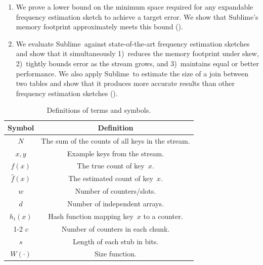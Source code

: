 \documentclass[sigconf]{acmart}
\newcommand{\sketch}{Sublime}
\begin{document}
\begin{enumerate}
    \item We prove a lower bound on the minimum space required for any expandable frequency estimation sketch to achieve a target error.
        We show that \sketch's memory footprint approximately meets this bound ().

    \item We evaluate \sketch\ against state-of-the-art frequency estimation sketches and show that it simultaneously 1)~reduces the memory footprint under skew, 2)~tightly bounds error as the stream grows, and 3)~maintains equal or better performance.
        We also apply \sketch\ to estimate the size of a join between two tables and show that it produces more accurate results than other frequency estimation sketches ().
\end{enumerate}

\begin{table}
    \centering
    \bgroup
    \def\arraystretch{1.025}
    \small
    \begin{tabular}{cc}
        \toprule
        \textbf{Symbol} & \textbf{Definition} \\
        \midrule
        $N$ & The sum of the counts of all keys in the stream. \\
        $x, y$ & Example keys from the stream. \\
        $f(x)$ & The true count of key~$x$. \\
        $\hat{f}(x)$ & The estimated count of key~$x$. \\
        $w$ & Number of counters/slots. \\
        $d$ & Number of independent arrays. \\
        $h_i(x)$ & Hash function mapping key~$x$ to a counter. \\
        \cmidrule{1-2}
        $c$ & Number of counters in each chunk. \\
        $s$ & Length of each stub in bits. \\
        $W(\cdot)$ & Size function. \\
        \bottomrule
    \end{tabular}
    \egroup
    \caption{Definitions of terms and symbols.}
    \iftods
        \vspace{-7mm}
    \fi
    \label{tab:term_and_symbol_definitions}
\end{table}
\end{document}
